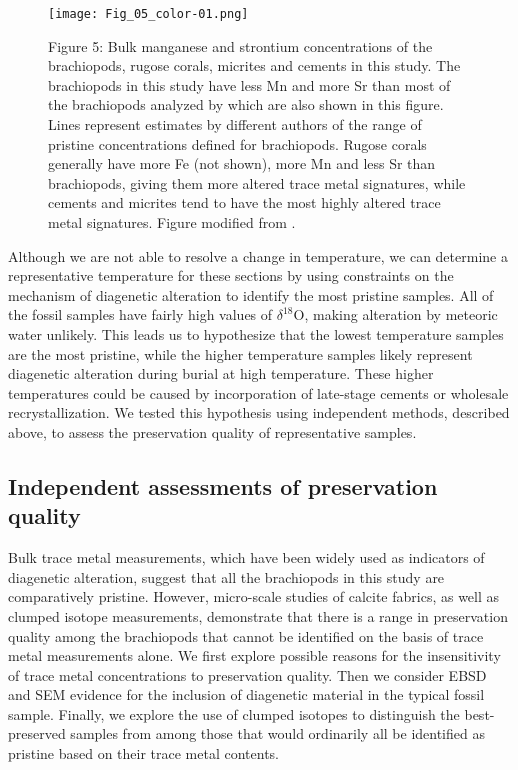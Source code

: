 \documentclass[5p, authoryear]{elsarticle}
\begin{document}
\begin{figure}[t]
\centering
\texttt{[image: Fig\_05\_color-01.png]}
\captionsetup{labelformat=empty} 
\caption{Figure 5: Bulk manganese and strontium concentrations of the brachiopods, rugose corals, micrites and cements in this study. The brachiopods in this study have less Mn and more Sr than most of the brachiopods analyzed by \cite{Brand2012} which are also shown in this figure. Lines represent estimates by different authors of the range of pristine concentrations defined for brachiopods. Rugose corals generally have more Fe (not shown), more Mn and less Sr than brachiopods, giving them more altered trace metal signatures, while cements and micrites tend to have the most highly altered trace metal signatures. Figure modified from \cite{Brand2012}.}
\label{metals}
\end{figure}

Although we are not able to resolve a change in temperature, we can determine a representative temperature for these sections by using constraints on the mechanism of diagenetic alteration to identify the most pristine samples. All of the fossil samples have fairly high values of $\delta^{18}$O, making alteration by meteoric water unlikely. This leads us to hypothesize that the lowest temperature samples are the most pristine, while the higher temperature samples likely represent diagenetic alteration during burial at high temperature. These higher temperatures could be caused by incorporation of late-stage cements or wholesale recrystallization. We tested this hypothesis using independent methods, described above, to assess the preservation quality of representative samples. 

\subsection{Independent assessments of preservation quality}

Bulk trace metal measurements, which have been widely used as indicators of diagenetic alteration, suggest that all the brachiopods in this study are comparatively pristine. However, micro-scale studies of calcite fabrics, as well as clumped isotope measurements, demonstrate that there is a range in preservation quality among the brachiopods that cannot be identified on the basis of trace metal measurements alone. We first explore possible reasons for the insensitivity of trace metal concentrations to preservation quality. Then we consider EBSD and SEM evidence for the inclusion of diagenetic material in the typical fossil sample. Finally, we explore the use of clumped isotopes to distinguish the best-preserved samples from among those that would ordinarily all be identified as pristine based on their trace metal contents.  
\end{document}
